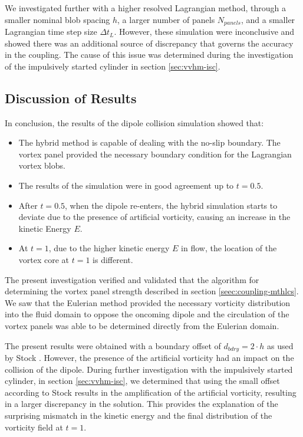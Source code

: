 We investigated further with a higher resolved Lagrangian method, through a smaller nominal blob spacing $h$, a larger number of panels $N_{panels}$, and a smaller Lagrangian time step size $\Delta t_L$. However, these simulation were inconclusive and showed there was an additional source of discrepancy that governs the accuracy in the coupling. The cause of this issue was determined during the investigation of the impulsively started cylinder in section \ref{sec:vvhm-isc}.%


\subsection{Discussion of Results}

In conclusion, the results of the dipole collision simulation showed that:
\begin{itemize}
\item The hybrid method is capable of dealing with the no-slip boundary. The vortex panel provided the necessary boundary condition for the Lagrangian vortex blobs.
\item The results of the simulation were in good agreement up to $t=0.5$.
\item After $t=0.5$, when the dipole re-enters, the hybrid simulation starts to deviate due to the presence of artificial vorticity, causing an increase in the kinetic Energy $E$.
\item At $t=1$, due to the higher kinetic energy $E$ in flow, the location of the vortex core at $t=1$ is different.
\end{itemize}

The present investigation verified and validated that the algorithm for determining the vortex panel strength described in section \ref{seec:coupling-mthlcs}. We saw that the Eulerian method provided the necessary vorticity distribution into the fluid domain to oppose the oncoming dipole and the circulation of the vortex panels was able to be determined directly from the Eulerian domain.

The present results were obtained with a boundary offset of $d_{bdry}=2\cdot{h}$ as used by Stock \cite{Stock2010a}. However, the presence of the artificial vorticity had an impact on the collision of the dipole. During further investigation with the impulsively started cylinder, in section \ref{sec:vvhm-isc}, we determined that using the small offset according to Stock results in the amplification of the artificial vorticity, resulting in a larger discrepancy in the solution. This provides the explanation of the surprising mismatch in the kinetic energy and the final distribution of the vorticity field at $t=1$.

